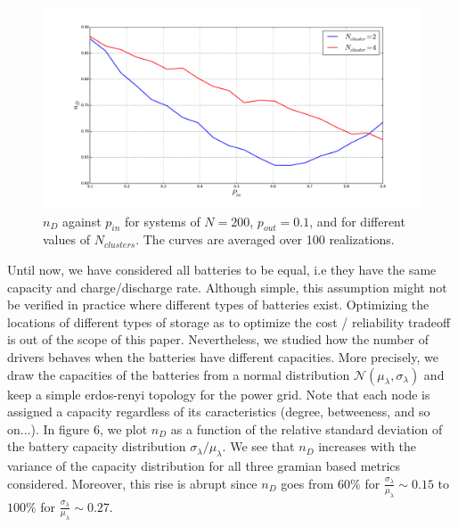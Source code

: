 \documentclass[conference]{IEEEtran}
\begin{document}
\begin{figure}
\label{fig:block_model_2}
\includegraphics[scale=.25]{block_model_4}
\caption{$n_D$ against $ p_{in} $ for systems of $N=200 $, $p_{out} = 0.1 $, and for different values of $N_{clusters} $. The curves are averaged over 100 realizations.}
\end{figure}


Until now, we have considered all batteries to be equal, i.e they have the same capacity and charge/discharge rate. Although simple, this assumption might not be verified in practice where different types of batteries exist. Optimizing the locations of different types of storage as to optimize the cost / reliability tradeoff is out of the scope of this paper. Nevertheless, we studied how the number of drivers behaves when the batteries have different capacities. More precisely, we draw the capacities of the batteries from a normal distribution $ \mathcal{N}( \mu_{\lambda}, \sigma_{\lambda} ) $ and keep a simple erdos-renyi topology for the power grid. Note that each node is assigned a capacity regardless of its caracteristics (degree, betweeness, and so on...). In figure 6, we plot $n_D$ as a function of the relative standard deviation of the battery capacity distribution $ \sigma_{\lambda} / \mu_{\lambda} $. We see that $n_D$ increases with the variance of the capacity distribution for all three gramian based metrics considered. Moreover, this rise is abrupt since $n_D$ goes from $ 60 \%$ for $\frac{\sigma_{\lambda}}{\mu_{\lambda}} \sim 0.15 $ to $100 \% $ for $\frac{\sigma_{\lambda}}{\mu_{\lambda}} \sim 0.27 $. 
\end{document}
